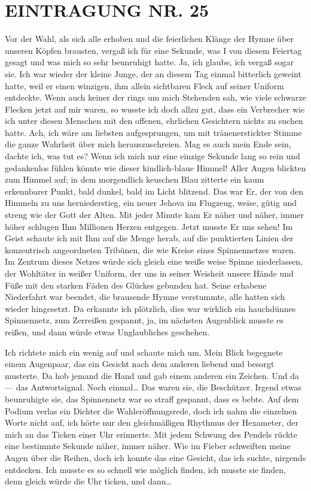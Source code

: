 \section{EINTRAGUNG NR. 25}

Vor der Wahl, als sich alle erhoben und die feierlichen Klänge der
Hymne über unseren Köpfen brausten, vergaß ich für eine Sekunde,
was I von diesem Feiertag gesagt und was mich so sehr beunruhigt
hatte. Ja, ich glaube, ich vergaß sogar sie. Ich war wieder der
kleine Junge, der an diesem Tag einmal bitterlich geweint hatte,
weil er einen winzigen, ihm allein sichtbaren Fleck auf seiner
Uniform entdeckte. Wenn auch keiner der rings um mich Stehenden
sah, wie viele schwarze Flecken jetzt auf mir waren, so wusste ich
doch allzu gut, dass ein Verbrecher wie ich unter diesen Menschen
mit den offenen, ehrlichen Gesichtern nichts zu suchen hatte. Ach,
ich wäre am liebsten aufgesprungen, um mit tränenerstickter Stimme
die ganze Wahrheit über mich herauszuschreien. Mag es auch mein Ende
sein, dachte ich, was tut es? Wenn ich mich nur eine einzige
Sekunde lang so rein und gedankenlos fühlen könnte wie dieser
kindlich-blaue Himmel! Aller Augen blickten zum Himmel auf; in dem
morgendlich keuschen Blau zitterte ein kaum erkennbarer Punkt, bald
dunkel, bald im Licht blitzend. Das war Er, der von den Himmeln zu
uns herniederstieg, ein neuer Jehova im Flugzeug, weise, gütig und
streng wie der Gott der Alten. Mit jeder Minute kam Er näher und
näher, immer höher schlugen Ihm Millionen Herzen entgegen. Jetzt
musste Er uns sehen! Im Geist schaute ich mit Ihm auf die Menge
herab, auf die punktierten Linien der konzentrisch angeordneten
Tribünen, die wie Kreise eines Spinnennetzes waren. Im Zentrum
dieses Netzes würde sich gleich eine
weiße weise Spinne niederlassen, der Wohltäter in weißer Uniform,
der uns in seiner Weisheit unsere Hände und Füße mit den starken
Fäden des Glückes gebunden hat. Seine erhabene Niederfahrt war
beendet, die brausende Hymne verstummte, alle hatten sich wieder
hingesetzt. Da erkannte ich plötzlich, dies war wirklich ein
hauchdünnes Spinnennetz, zum Zerreißen gespannt, ja, im nächsten
Augenblick musste es reißen, und dann würde etwas Unglaubliches
geschehen.

Ich richtete mich ein wenig auf und schaute mich um. Mein Blick
begegnete einem Augenpaar, das ein Gesicht nach dem anderen liebend
und besorgt musterte. Da hob jemand die Hand und gab einem anderen
ein Zeichen. Und da — das Antwortsignal. Noch einmal\ldots{} Das waren
sie, die Beschützer. Irgend etwas beunruhigte sie, das Spinnennetz
war so straff gespannt, dass es bebte. Auf dem Podium verlas ein
Dichter die Wahleröffnungsrede, doch ich nahm die einzelnen Worte
nicht auf, ich hörte nur den gleichmäßigen Rhythmus der Hexameter,
der mich an das Ticken einer Uhr erinnerte. Mit jedem Schwung des
Pendels rückte eine bestimmte Sekunde näher, immer näher. Wie im
Fieber schweiften meine Augen über die Reihen, doch ich konnte das
eine Gesicht, das ich suchte, nirgends entdecken. Ich musste es so
schnell wie möglich finden, ich musste sie finden, denn gleich
würde die Uhr ticken, und dann\ldots{}


